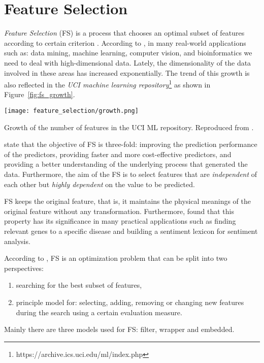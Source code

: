 \chapter{Feature Selection}
\label{ch:feature-selection}

\textit{Feature Selection} (FS) is a process that chooses an optimal subset of features according to certain criterion \citep{liu2012feature}. According to \citet{sammut2017encyclopedia}, in many real-world applications such as: data mining, machine learning, computer vision, and bioinformatics we need to deal with high-dimensional data. Lately, the dimensionality of the data involved in these areas has increased exponentially. The trend of this growth is also reflected in the \textit{UCI machine learning repository}\footnote{https://archive.ics.uci.edu/ml/index.php} as shown in Figure~\ref{fig:fs_growth}.

\begin{marginfigure}
  \texttt{[image: feature\_selection/growth.png]}
  \caption{Growth of the number of features in the UCI ML repository. Reproduced from \citet{sammut2017encyclopedia}.}
  \label{fig:fs_growth}
\end{marginfigure}

\citet{guyon2003introduction} state that the objective of FS is three-fold: improving the prediction performance of the predictors, providing faster and more cost-effective predictors, and providing a better understanding of the underlying process that generated the data. Furthermore, the aim of the FS is to select features that are \textit{independent} of each other but \textit{highly dependent} on the value to be predicted.

FS keeps the original feature, that is, it maintains the physical meanings of the original feature without any transformation. Furthermore, \citet{masaeli2010transformation} found that this property has its significance in many practical applications such as finding relevant genes to a specific disease and building a sentiment lexicon for sentiment analysis.

According to \citet{zhao2010advancing}, FS is an optimization problem that can be split into two perspectives:
\begin{enumerate}
  \item searching for the best subset of features,
  \item principle model for: selecting, adding, removing or changing new features during the search using a certain evaluation measure.
\end{enumerate}
Mainly there are three models used for FS: filter, wrapper and embedded.

